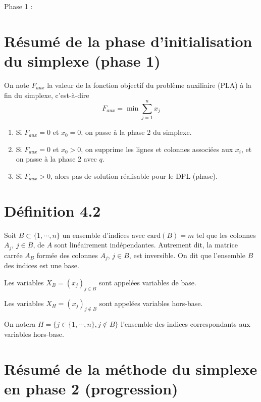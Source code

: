 \documentclass[12pt]{article}
\begin{document}
Phase 1 :
\section*{Résumé de la phase d'initialisation du simplexe (phase 1)}

On note \( F_{aux} \) la valeur de la fonction objectif du problème auxiliaire (PLA) à la fin du simplexe, c'est-à-dire 
\[ F_{aux} = \min \sum_{j=1}^{n} x_j \]

\begin{enumerate}
    \item Si \( F_{aux} = 0 \) et \( x_0 = 0 \), on passe à la phase 2 du simplexe.
    \item Si \( F_{aux} = 0 \) et \( x_0 > 0 \), on supprime les lignes et colonnes associées aux \( x_i \), et on passe à la phase 2 avec \( q \).
    \item Si \( F_{aux} > 0 \), alors pas de solution réalisable pour le DPL (phase).
\end{enumerate}



\section*{Définition 4.2}

Soit $B \subset \{1, \cdots, n\}$ un ensemble d'indices avec $\text{card}(B) = m$ tel que les colonnes $A_j$, $j \in B$, de $A$ sont linéairement indépendantes. Autrement dit, la matrice carrée $A_B$ formée des colonnes $A_j$, $j \in B$, est inversible. On dit que l'ensemble $B$ des indices est une base.

Les variables $X_B = (x_j)_{j \in B}$ sont appelées variables de base.

Les variables $X_H = (x_j)_{j \notin B}$ sont appelées variables hors-base.

On notera $H = \{j \in \{1, \cdots, n\}, j \notin B\}$ l'ensemble des indices correspondants aux variables hors-base.
\section*{Résumé de la méthode du simplexe en phase 2 (progression)}
\end{document}
